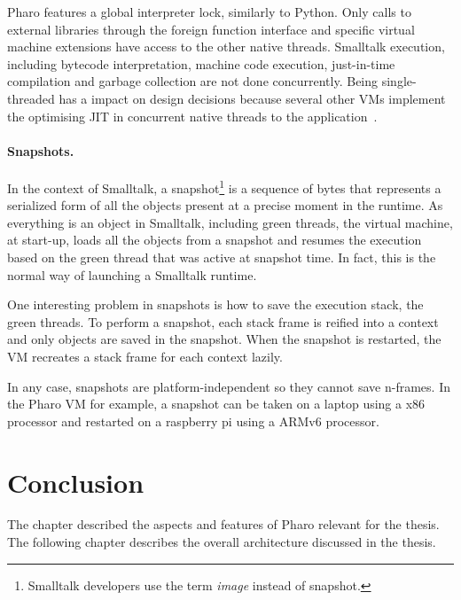 \documentclass[a4paper,12pt,twoside]{../includes/ThesisStyle}
\begin{document}
Pharo features a global interpreter lock, similarly to Python. Only calls to external libraries through the foreign function interface and specific virtual machine extensions have access to the other native threads. Smalltalk execution, including bytecode interpretation, machine code execution, just-in-time compilation and garbage collection are not done concurrently. Being single-threaded has a impact on design decisions because several other VMs implement the optimising JIT in concurrent native threads to the application~\cite{Arn00}.


\paragraph{Snapshots.}
\label{par:snapshot}

In the context of Smalltalk, a snapshot\footnote{Smalltalk developers use the term \emph{image} instead of snapshot.} is a sequence of bytes that represents a serialized form of all the objects present at a precise moment in the runtime. As everything is an object in Smalltalk, including green threads, the virtual machine, at start-up, loads all the objects from a snapshot and resumes the execution based on the green thread that was active at snapshot time. In fact, this is the normal way of launching a Smalltalk runtime. 

One interesting problem in snapshots is how to save the execution stack, \ie the green threads. To perform a snapshot, each stack frame is reified into a context and only objects are saved in the snapshot. When the snapshot is restarted, the VM recreates a stack frame for each context lazily. 

In any case, snapshots are platform-independent so they cannot save n-frames. In the Pharo VM for example, a snapshot can be taken on a laptop using a x86 processor and restarted on a raspberry pi using a ARMv6 processor.


\section*{Conclusion} 

The chapter described the aspects and features of Pharo relevant for the thesis. The following chapter describes the overall architecture discussed in the thesis.

\ifx\wholebook\relax\else
    
\end{document}
